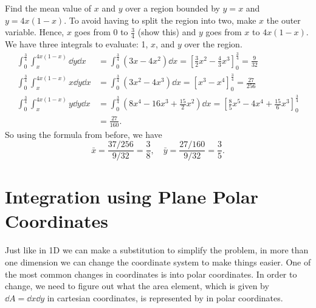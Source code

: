 \documentclass[../multivariate_calculus.tex]{subfiles}
\begin{document}
        \begin{example}
            Find the mean value of $x$ and $y$ over a region bounded by $y=x$ and $y=4x(1-x)$.
            To avoid having to split the region into two, make $x$ the outer variable.
            Hence, $x$ goes from 0 to $\frac{3}{4}$ (show this) and $y$ goes from $x$ to $4x(1-x)$.
            We have three integrals to evaluate: 1, $x$, and $y$ over the region.
            \begin{align}
                \int_0^\frac{3}{4}\int_x^{4x(1-x)}\dd{y}\dd{x}&=\int_0^\frac{3}{4}(3x-4x^2)\dd{x}=\left[\frac{3}{2}x^2-\frac{4}{3}x^3\right]_0^\frac{3}{4}=\frac{9}{32}\\
                \int_0^\frac{3}{4}\int_x^{4x(1-x)}x\dd{y}\dd{x}&=\int_0^\frac{3}{4}(3x^2-4x^3)\dd{x}=\left[x^3-x^4\right]_0^\frac{3}{4}=\frac{27}{256}\\
                \int_0^\frac{3}{4}\int_x^{4x(1-x)}y\dd{y}\dd{x}&=\int_0^\frac{3}{4}\left(8x^4-16x^3+\frac{15}{2}x^2\right)\dd{x}=\left[\frac{8}{5}x^5-4x^4+\frac{15}{6}x^3\right]_0^\frac{3}{4}\\
                &=\frac{27}{160}.
            \end{align}
            So using the formula from before, we have
            \begin{equation}
                \bar{x}=\frac{37/256}{9/32}=\frac{3}{8},\quad\bar{y}=\frac{27/160}{9/32}=\frac{3}{5}.
            \end{equation}
        \end{example}

    \section{Integration using Plane Polar Coordinates}
        \paragraph{}
        Just like in 1D we can make a substitution to simplify the problem, in more than one dimension we can change the coordinate system to make things easier.
        One of the most common changes in coordinates is into polar coordinates.
        In order to change, we need to figure out what the area element, which is given by $\dd{A}=\dd{x}\dd{y}$ in cartesian coordinates, is represented by in polar coordinates.
        
\end{document}

